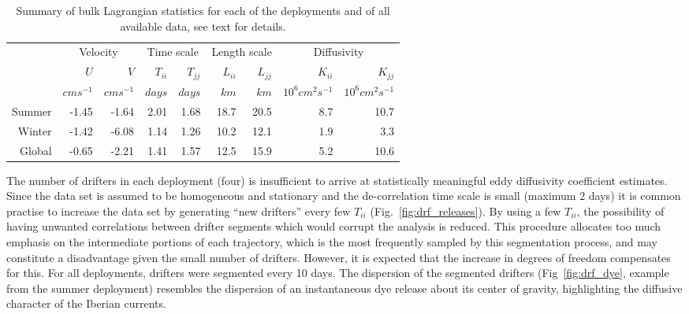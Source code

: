 \begin{table}
  \centering
\begin{tabular}{rrrrrrrrr}
\hline \hline & \multicolumn{2}{c}{ Velocity } &
\multicolumn{2}{c}{Time scale}& \multicolumn{2}{c}{Length scale}&
\multicolumn{2}{c}{Diffusivity}\\
\cline{1-9}  & $U$  & $V$  & $T_{ii}$ &
 $T_{jj}$ & $L_{ii}$ & $L_{jj}$  &
 $K_{ii}$ & $K_{jj}$\\
  & $cms^{-1}$  & $cms^{-1}$  & $days$ &
 $days$ & $km$ & $km$  & $10^6 cm^2s^{-1}$ & $10^6 cm^2s^{-1}$\\
 \cline{1-9} %
Summer&-1.45&-1.64&2.01&1.68&18.7&20.5&8.7&10.7\\
Winter&-1.42&-6.08&1.14&1.26&10.2&12.1&1.9&3.3\\
Global&-0.65&-2.21&1.41&1.57&12.5&15.9&5.2&10.6\\
\hline \hline
\end{tabular}
  \caption{Summary of bulk Lagrangian statistics for each of the
  deployments and of all available data, see text for details.}
  \label{tb:drf_drifters}
\end{table}

The number of drifters in each deployment (four) is insufficient
to arrive at statistically meaningful eddy diffusivity coefficient
estimates. Since the data set is assumed to be homogeneous and
stationary and the de-correlation time scale is small (maximum 2
days) it is common practise to increase the data set by generating
``new drifters'' every few $T_{ii}$
\citep{Colin83}(Fig.~\ref{fig:drf_releases}). By using a few
$T_{ii}$, the possibility of having unwanted correlations between
drifter segments which would corrupt the analysis is reduced. This
procedure allocates too much emphasis on the intermediate portions
of each trajectory, which is the most frequently sampled by this
segmentation process, and may constitute a disadvantage given the
small number of drifters. However, it is expected that the
increase in degrees of freedom compensates for this. For all
deployments, drifters were segmented every 10 days. The dispersion
of the segmented drifters (Fig~\ref{fig:drf_dye}, example from the
summer deployment) resembles the dispersion of an instantaneous
dye release about its center of gravity, highlighting the
diffusive character of the Iberian currents.

